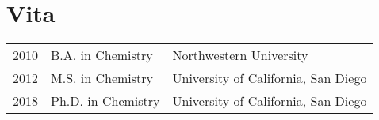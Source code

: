 
\begingroup
\chapter*{Vita}
\endgroup

\noindent\begin{tabularx}{\linewidth}{llX}
    2010 & B.A. in Chemistry & \hfill Northwestern University \\
    2012 & M.S. in Chemistry & \hfill University of California, San Diego \\
    2018 & Ph.D. in Chemistry & \hfill University of California, San Diego
\end{tabularx}


